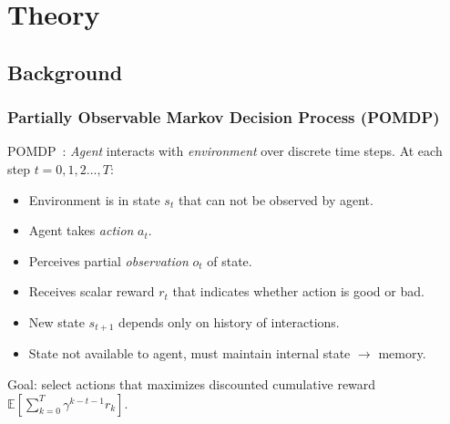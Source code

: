 \section{Theory}

\subsection{Background}

\begin{frame}
    \frametitle{Partially Observable Markov Decision Process (POMDP)}

    POMDP~\cite{kaelbling_planning_1998}: \textit{Agent} interacts with \textit{environment} over discrete time steps. At each step \(t = 0, 1, 2\dots, T\):

    \begin{itemize}
        \item Environment is in state \(s_t\) that can not be observed by agent.
        \item Agent takes \textit{action} \(a_t\).
        \item Perceives partial \textit{observation} \(o_t\) of state.
        \item Receives scalar reward \(r_t\) that indicates whether action is good or bad.
        \item New state \(s_{t+1}\) depends only on history of interactions.
        \item State not available to agent, must maintain internal state \(\rightarrow\) memory.
    \end{itemize}

    Goal: select actions that maximizes discounted cumulative reward \(\mathbb{E} \left\lbrack \sum_{k=0}^{T} \gamma^{k-t-1} r_k \right\rbrack\).

    \begin{figure}
        \centering
        \scalebox{0.75}{}
    \end{figure}
\end{frame}

